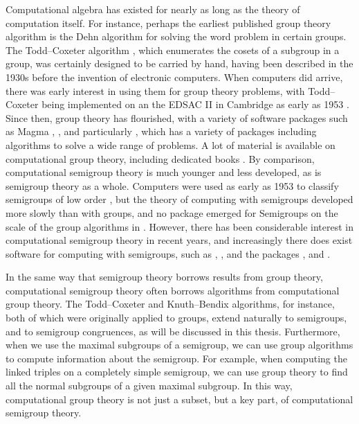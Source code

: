 Computational algebra has existed for nearly as long as the theory of
computation itself.  For instance, perhaps the earliest published group theory
algorithm is the Dehn algorithm \cite{dehn_1911} for solving the word problem in
certain groups.  The Todd--Coxeter algorithm \cite{todd_coxeter_1936}, which
enumerates the cosets of a subgroup in a group, was certainly designed to be
carried by hand, having been described in the 1930s before the invention of
electronic computers.  When computers did arrive, there was early interest in
using them for group theory problems, with Todd--Coxeter being implemented on an
the EDSAC II in Cambridge as early as 1953 \cite{leech_1963}.  Since then, group
theory has flourished, with a variety of software packages such as
\textsf{Magma} \cite{magma}, \ACE{} \cite{ace}, and particularly \GAP{}
\cite{gap}, which has a variety of packages including algorithms to solve a wide
range of problems.  A lot of material is available on computational group
theory, including dedicated books \cite{sims, cgt}.  By comparison,
computational semigroup theory is much younger and less developed, as is
semigroup theory as a whole.  Computers were used as early as 1953 to classify
semigroups of low order \cite{tamura_1953, froidure_pin}, but the theory of
computing with semigroups developed more slowly than with groups, and no package
emerged for Semigroups on the scale of the group algorithms in \GAP{}.  However,
there has been considerable interest in computational semigroup theory in recent
years, and increasingly there does exist software for computing with semigroups,
such as \Semigroupe{} \cite{semigroupe}, \libsemigroups{} \cite{libsemigroups},
and the \GAP{} packages \Semigroups{} \cite{semigroups}, \smallsemi{}
\cite{smallsemi} and \kbmag{} \cite{kbmag}.

In the same way that semigroup theory borrows results from group theory,
computational semigroup theory often borrows algorithms from computational group
theory.  The Todd--Coxeter and Knuth--Bendix algorithms, for instance, both of
which were originally applied to groups, extend naturally to semigroups, and to
semigroup congruences, as will be discussed in this thesis.  Furthermore, when
we use the maximal subgroups of a semigroup, we can use group algorithms to
compute information about the semigroup.  For example, when computing the
linked triples on a completely simple semigroup, we can use group theory to find
all the normal subgroups of a given maximal subgroup.  In this way,
computational group theory is not just a subset, but a key part, of
computational semigroup theory.

